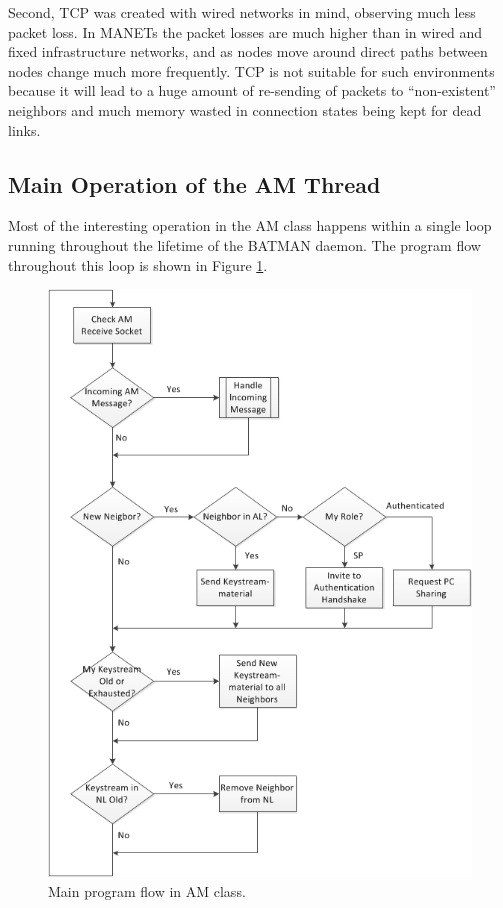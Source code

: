 Second, TCP was created with wired networks in mind, observing much less packet
loss. In \acp{MANET} the packet losses are much higher than in wired and fixed
infrastructure networks, and as nodes move around direct paths between nodes
change much more frequently. TCP is not suitable for such environments because
it will lead to a huge amount of re-sending of packets to ``non-existent''
neighbors and much memory wasted in connection states being kept for dead links.

\subsection{Main Operation of the AM Thread}
Most of the interesting operation in the AM class happens within a single loop
running throughout the lifetime of the BATMAN daemon. The program flow
throughout this loop is shown in Figure \ref{fig:am_main_loop}.

\begin{figure}[h!]
	\centering
	\includegraphics[width=\textwidth]{images/am_main_loop.png}
	\caption{Main program flow in AM class.}
	\label{fig:am_main_loop}
	\clearpage
\end{figure}

